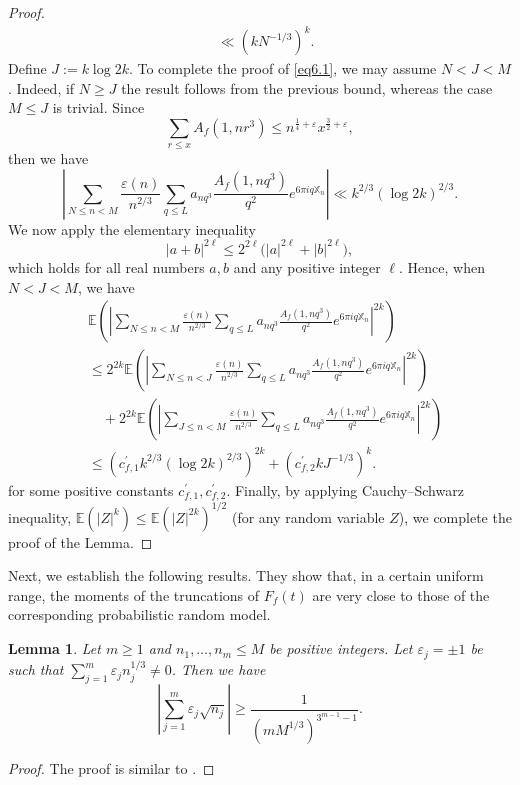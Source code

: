 \documentclass[10pt,leqno]{amsart}
\numberwithin{equation}{section}
\newtheorem{lemma}[definition]{{Lemma}}
\begin{document}
\begin{proof}
\[\begin{aligned}
&  \ll\left(k N^{-1/3}\right)^k.
\end{aligned}
\]
Define $J := k\log 2k$. To complete the proof of \eqref{eq6.1}, we may assume $N < J < M$. Indeed, if $N \ge J$ the result follows from the previous bound, whereas the case $M \le J$ is trivial. Since 
\[
\sum_{r\leqslant x}A_f(1,nr^3) \leqslant n^{\frac{1}{4}+\varepsilon}x^{\frac{3}{2}+\varepsilon},
\]
then we have
\[
\left|\sum_{N \leqslant n<M} \frac{\varepsilon(n)}{n^{2 / 3}} \sum_{q \leqslant L} a_{n q^3} \frac{A_f\left(1,n q^3\right)}{q^{2}} e^{6 \pi i q \mathbb{X}_n}\right|  \ll k^{2 / 3}(\log 2k)^{2/3}.
\]
We now apply the elementary inequality
\[
|a+b|^{2\ell} \leqslant 2^{2\ell}\bigl( |a|^{2\ell} + |b|^{2\ell} \bigr),
\]
which holds for all real numbers $a, b$ and any positive integer $\ell$.  Hence, when $N<J<M$, we have
\[
\begin{aligned}
& \mathbb{E}\left(\left|\sum_{N \leqslant n<M} \frac{\varepsilon(n)}{n^{2 / 3}} \sum_{q \leqslant L} a_{n q^3} \frac{A_f\left(1,n q^3\right)}{q^{2}} e^{6 \pi i q \mathbb{X}_n}\right|^{2 k}\right) \\
& \leqslant 2^{2 k} \mathbb{E}\left(\left|\sum_{N \leqslant n<J} \frac{\varepsilon(n)}{n^{2/3}} \sum_{q \leqslant L} a_{n q^3} \frac{A_f\left(1,n q^3\right)}{q^{2}} e^{6\pi i q \mathbb{X}_n}\right|^{2 k}\right) \\
& \quad+2^{2 k} \mathbb{E}\left(\left|\sum_{J \leqslant n<M} \frac{\varepsilon(n)}{n^{2/3}} \sum_{q \leqslant L} a_{n q^3} \frac{A_f\left(1,n q^3\right)}{q^{2}} e^{6 \pi i q \mathbb{X}_n}\right|^{2 k}\right) \\
& \leqslant\left(c^\prime_{f,1} k^{2/3}\left(\log 2k\right)^{2/3}\right)^{2 k}+\left(c^\prime_{f,2} kJ^{-1/3}\right)^k.
\end{aligned}
\]
for some positive constants $c^\prime_{f,1}, c^\prime_{f,2}$. Finally, by applying Cauchy--Schwarz inequality, $\mathbb{E}(|Z|^k) \leqslant \mathbb{E}(|Z|^{2k})^{1/2}$ (for any random variable $Z$), we complete the proof of the Lemma.
\end{proof}

Next, we establish the following results. They show that, in a certain uniform range, the moments of the truncations of $F_f(t)$ are very close to those of the corresponding probabilistic random model.
\begin{lemma}\label{le6.2}
Let $m \geqslant 1$ and $n_1, \ldots, n_m \leqslant M$ be positive integers. Let $\varepsilon_j= \pm 1$ be such that $\sum_{j=1}^m \varepsilon_j n_j^{1/3} \neq 0$. Then we have
\[
\left|\sum_{j=1}^m \varepsilon_j \sqrt{n_j}\right| \geqslant \frac{1}{(m M^{1/3})^{3^{m-1}-1}} .
\]
\end{lemma}
\begin{proof}
   The proof is similar to \cite[Lemma 3.5]{MR2039790}.
\end{proof}
\end{document}
